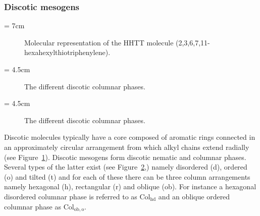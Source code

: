 \subsubsection{Discotic mesogens}

\picW = 7cm
\begin{figure}
	\centering
	\caption{Molecular representation of the HHTT molecule
	(2,3,6,7,11-hexa\-hexyl\-thio\-triphenylene).}
	\label{fig:typDisc}
\end{figure}


\picW = 4.5cm
\begin{figure}
	\centering
	\caption{The different discotic columnar phases.}
	\label{fig:discColumnPhases}
\end{figure}

\picW = 4.5cm
\begin{figure}
	\centering
	\caption{The different discotic columnar phases.}
	\label{fig:discColumnStack}
\end{figure}


Discotic molecules typically have a core composed of aromatic rings connected in an
approximately circular arrangement from which alkyl chains extend radially 
(see Figure~\ref{fig:typDisc}).  Discotic mesogens form discotic nematic and columnar phases. Several
types of the latter exist (see Figure~\ref{fig:discColumnPhases},) namely disordered (d), ordered (o) 
and tilted (t)  and for each of these there can be three column arrangements namely 
hexagonal (h), rectangular (r)  and oblique (ob). For instance a hexagonal disordered columnar 
phase is referred to as $\mathrm{Col}_{\mathrm{hd}}$ and an oblique ordered columnar phase as
$\mathrm{Col}_{\mathrm{ob,o}}$. 


